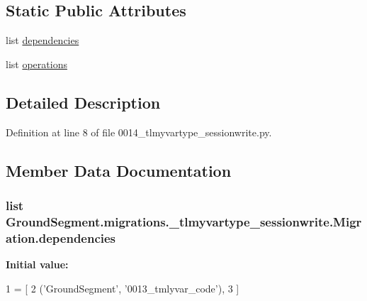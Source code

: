 \subsection*{Static Public Attributes}
\begin{DoxyCompactItemize}
\item 
list \hyperlink{class_ground_segment_1_1migrations_1_10014__tlmyvartype__sessionwrite_1_1_migration_a134f0f445177614530a3fad64132212a}{dependencies}
\item 
list \hyperlink{class_ground_segment_1_1migrations_1_10014__tlmyvartype__sessionwrite_1_1_migration_a52b37bc36d253846ab5629616264650b}{operations}
\end{DoxyCompactItemize}


\subsection{Detailed Description}


Definition at line 8 of file 0014\+\_\+tlmyvartype\+\_\+sessionwrite.\+py.



\subsection{Member Data Documentation}
\hypertarget{class_ground_segment_1_1migrations_1_10014__tlmyvartype__sessionwrite_1_1_migration_a134f0f445177614530a3fad64132212a}{}
\subsubsection[{dependencies}]{\setlength{\rightskip}{0pt plus 5cm}list Ground\+Segment.\+migrations.\+\_\+tlmyvartype\+\_\+sessionwrite.\+Migration.\+dependencies\hspace{0.3cm}{\ttfamily [static]}}\label{class_ground_segment_1_1migrations_1_10014__tlmyvartype__sessionwrite_1_1_migration_a134f0f445177614530a3fad64132212a}
{\bfseries Initial value\+:}
\begin{DoxyCode}
1 = [
2         (\textcolor{stringliteral}{'GroundSegment'}, \textcolor{stringliteral}{'0013\_tmlyvar\_code'}),
3     ]
\end{DoxyCode}


